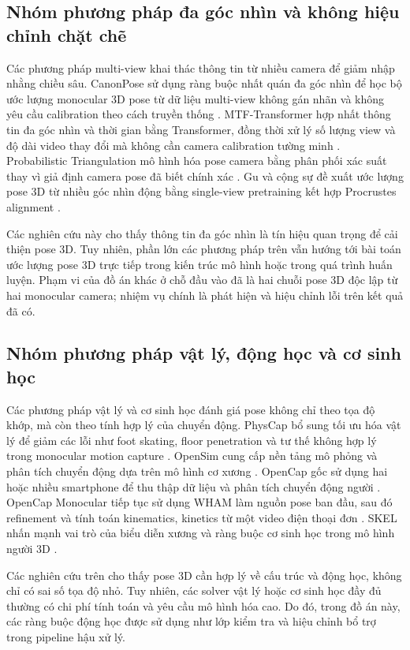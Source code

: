 \documentclass[../DoAn.tex]{subfiles}
\begin{document}
\subsection{Nhóm phương pháp đa góc nhìn và không hiệu chỉnh chặt chẽ}
Các phương pháp multi-view khai thác thông tin từ nhiều camera để giảm nhập nhằng chiều sâu. CanonPose sử dụng ràng buộc nhất quán đa góc nhìn để học bộ ước lượng monocular 3D pose từ dữ liệu multi-view không gán nhãn và không yêu cầu calibration theo cách truyền thống \cite{canonpose2021}. MTF-Transformer hợp nhất thông tin đa góc nhìn và thời gian bằng Transformer, đồng thời xử lý số lượng view và độ dài video thay đổi mà không cần camera calibration tường minh \cite{mtftransformer2023}. Probabilistic Triangulation mô hình hóa pose camera bằng phân phối xác suất thay vì giả định camera pose đã biết chính xác \cite{probtriangulation2023}. Gu và cộng sự đề xuất ước lượng pose 3D từ nhiều góc nhìn động bằng single-view pretraining kết hợp Procrustes alignment \cite{gu2024multiview}.

Các nghiên cứu này cho thấy thông tin đa góc nhìn là tín hiệu quan trọng để cải thiện pose 3D. Tuy nhiên, phần lớn các phương pháp trên vẫn hướng tới bài toán ước lượng pose 3D trực tiếp trong kiến trúc mô hình hoặc trong quá trình huấn luyện. Phạm vi của đồ án khác ở chỗ đầu vào đã là hai chuỗi pose 3D độc lập từ hai monocular camera; nhiệm vụ chính là phát hiện và hiệu chỉnh lỗi trên kết quả đã có.

\subsection{Nhóm phương pháp vật lý, động học và cơ sinh học}
Các phương pháp vật lý và cơ sinh học đánh giá pose không chỉ theo tọa độ khớp, mà còn theo tính hợp lý của chuyển động. PhysCap bổ sung tối ưu hóa vật lý để giảm các lỗi như foot skating, floor penetration và tư thế không hợp lý trong monocular motion capture \cite{physcap2020}. OpenSim cung cấp nền tảng mô phỏng và phân tích chuyển động dựa trên mô hình cơ xương \cite{delp2007opensim}. OpenCap gốc sử dụng hai hoặc nhiều smartphone để thu thập dữ liệu và phân tích chuyển động người \cite{uhlrich2023opencap}. OpenCap Monocular tiếp tục sử dụng WHAM làm nguồn pose ban đầu, sau đó refinement và tính toán kinematics, kinetics từ một video điện thoại đơn \cite{gilon2026opencapmonocular}. SKEL nhấn mạnh vai trò của biểu diễn xương và ràng buộc cơ sinh học trong mô hình người 3D \cite{keller2023skin}.

Các nghiên cứu trên cho thấy pose 3D cần hợp lý về cấu trúc và động học, không chỉ có sai số tọa độ nhỏ. Tuy nhiên, các solver vật lý hoặc cơ sinh học đầy đủ thường có chi phí tính toán và yêu cầu mô hình hóa cao. Do đó, trong đồ án này, các ràng buộc động học được sử dụng như lớp kiểm tra và hiệu chỉnh bổ trợ trong pipeline hậu xử lý.
\end{document}
